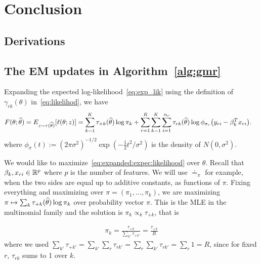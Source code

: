 \documentclass[12pt]{article}
\begin{document}
\section{Conclusion}
\label{sec:conc}
\cleardoublepage
\begin{appendices}
\section{Derivations}

\subsection{The EM updates in Algorithm~\ref{alg:gmr}}\label{sec:EM:details}

Expanding the expected log-likelihood~\eqref{eq:exp_lik} using the definition of~$\gamma_{rk}(\theta)$ in~\eqref{eq:likelihod}, we have
\begin{align}\label{eq:expanded:expec:likelihood}
	F(\theta;\widehat\theta) = E_{z \sim \tau(\widehat\theta)} [\ell(\theta;z)]
	&=\sum_{k=1}^K \tau_{+k}(\widehat\theta) \log \pi_k + 
	\sum_{r=1}^R \sum_{k=1}^K \sum_{i=1}^{n_r}  \tau_{rk}(\widehat\theta) \log \phi_{\sigma_r}\big( y_{ri} - \beta_k^T x_{ri} \big).
\end{align}
where $\phi_\sigma(t) := (2\pi \sigma^2)^{-1/2} \exp(-\frac12 t^2/\sigma^2)$ is the density of $N(0,\sigma^2)$.

We would like to maximize~\eqref{eq:expanded:expec:likelihood} over $\theta$. Recall that $\beta_k,x_{ri} \in \mathbb{R}^p$ where $p$ is the number of features.
We will use $\doteq_\pi$ for example, when the two sides are equal up to additive constants, as functions of $\pi$. Fixing everything and maximizing over $\pi = (\pi_1,\dots,\pi_k)$, we are maximizing $\pi \mapsto \sum_k \tau_{+k}(\widehat\theta) \log \pi_k$ over probability vector $\pi$. This is the MLE in the multinomial family and the solution is $\pi_k \propto_k \tau_{+k}$, that is

\begin{align}\label{eq:pi:update:1}
	    \pi_k = \frac{\tau_{+k}}{\sum_{k'} \tau_{+k'}}  = \frac{\tau_{+k}}{R}
	\end{align}
	where we used $\sum_{k'} \tau_{+k'} = \sum_{k'} \sum_r \tau_{rk'} = \sum_r \sum_{k'} \tau_{rk'} = \sum_r 1 = R$, since for fixed $r$, $\tau_{rk}$ sums to 1 over $k$.
	

\end{appendices}
\end{document}
